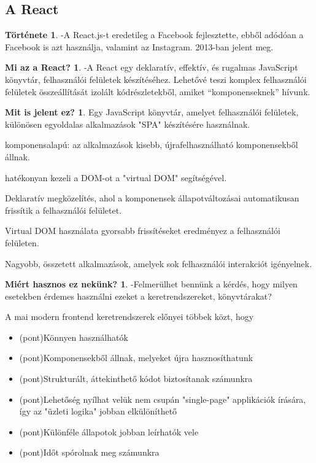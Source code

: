 \documentclass[colorlinks]{thesis-kando}
\theoremstyle{definition}
\newtheorem{tortenet}{Története}
\newtheorem{miareact}{Mi az a React?}
\newtheorem{mitjel}{Mit is jelent ez?}
\newtheorem{mierhasz}{Miért hasznos ez nekünk?}
\theoremstyle{remark}
\begin{document}
\subsection{A React}
\begin{tortenet}
    \item \mbox \\-A React.js-t eredetileg a Facebook fejlesztette, ebből adódóan a Facebook is azt használja, valamint az Instagram. 2013-ban jelent meg.
\end{tortenet}
\begin{miareact}
    \item \mbox \\-A React egy deklaratív, effektív, és rugalmas JavaScript könyvtár, felhasználói felületek készítéséhez. Lehetővé teszi komplex felhasználói felületek összeállítását izolált kódrészletekből, amiket “komponenseknek” hívunk.
\end{miareact}
\begin{mitjel}
   
        
  
    \item Egy JavaScript könyvtár, amelyet
    felhasználói felületek, különösen
    egyoldalas alkalmazások "SPA"
    készítésére használnak.
    \item  komponensalapú: az alkalmazások
    kisebb, újrafelhasználható
    komponensekből állnak.
    \item hatékonyan kezeli a DOM-ot a "virtual
    DOM" segítségével.
    \item Deklaratív megközelítés, ahol a
    komponensek állapotváltozásai
    automatikusan frissítik a felhasználói
    felületet.
    \item Virtual DOM használata gyorsabb
    frissítéseket eredményez a
    felhasználói felületen.
    \item Nagyobb, összetett alkalmazások,
    amelyek sok felhasználói interakciót
    igényelnek.


\end{mitjel}
\newpage
\begin{mierhasz}
    \item -Felmerülhet bennünk a kérdés, hogy milyen esetekben érdemes használni ezeket a keretrendszereket, könyvtárakat? 
    \item A mai modern frontend keretrendszerek előnyei többek közt, hogy
   \begin{itemize}
  
  
    \item (pont)Könnyen használhatók
   \item (pont)Komponensekből állnak, melyeket újra hasznosíthatunk
    \item(pont)Strukturált, áttekinthető kódot biztosítanak számunkra
    \item(pont)Lehetőség nyílhat velük nem csupán "single-page" applikációk írására, így az "üzleti logika" jobban elkülöníthető
   \item (pont)Különféle állapotok jobban leírhatók vele
    \item(pont)Időt spórolnak meg számunkra
\end{itemize}
\end{mierhasz}
\end{document}
